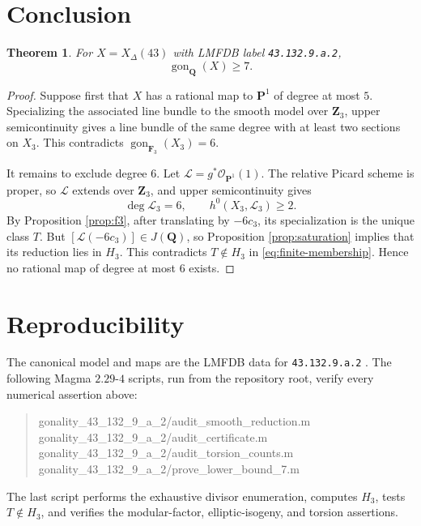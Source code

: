 \documentclass[11pt]{article}
\newcommand{\Q}{\mathbf Q}
\newcommand{\F}{\mathbf F}
\newcommand{\Pone}{\mathbf P^1}
\newcommand{\gon}{\operatorname{gon}}
\newcommand{\OO}{\mathcal O}
\newcommand{\code}[1]{\texttt{#1}}
\newtheorem{theorem}{Theorem}
\begin{document}
\section{Conclusion}

\begin{theorem}
For \(X=X_\Delta(43)\) with LMFDB label \code{43.132.9.a.2},
\[
                              \gon_\Q(X)\geq7.
\]
\end{theorem}

\begin{proof}
Suppose first that \(X\) has a rational map to \(\Pone\) of degree at
most \(5\).  Specializing the associated line bundle to the smooth model
over \(\mathbf Z_3\), upper semicontinuity gives a line bundle of the same
degree with at least two sections on \(X_3\).  This contradicts
\(\gon_{\F_3}(X_3)=6\).

It remains to exclude degree \(6\).  Let
\(\mathcal L=g^*\OO_{\Pone}(1)\).  The relative Picard scheme is proper,
so \(\mathcal L\) extends over \(\mathbf Z_3\), and upper semicontinuity
gives
\[
           \deg\mathcal L_3=6,\qquad
           h^0(X_3,\mathcal L_3)\geq2.
\]
By Proposition \ref{prop:f3}, after translating by \(-6c_3\), its
specialization is the unique class \(T\).  But
\([\mathcal L(-6c_3)]\in J(\Q)\), so Proposition
\ref{prop:saturation} implies that its reduction lies in \(H_3\).
This contradicts \(T\notin H_3\) in
\eqref{eq:finite-membership}.  Hence no rational map of degree at most
\(6\) exists.
\end{proof}

\section*{Reproducibility}

The canonical model and maps are the LMFDB data for
\code{43.132.9.a.2} \cite{LMFDB}.  The following Magma \(2.29\)-\(4\)
scripts, run from the repository root, verify every numerical assertion
above:
\begin{quote}\small\ttfamily
gonality\_43\_132\_9\_a\_2/audit\_smooth\_reduction.m\\
gonality\_43\_132\_9\_a\_2/audit\_certificate.m\\
gonality\_43\_132\_9\_a\_2/audit\_torsion\_counts.m\\
gonality\_43\_132\_9\_a\_2/prove\_lower\_bound\_7.m
\end{quote}
The last script performs the exhaustive divisor enumeration, computes
\(H_3\), tests \(T\notin H_3\), and verifies the modular-factor,
elliptic-isogeny, and torsion assertions.
\end{document}

